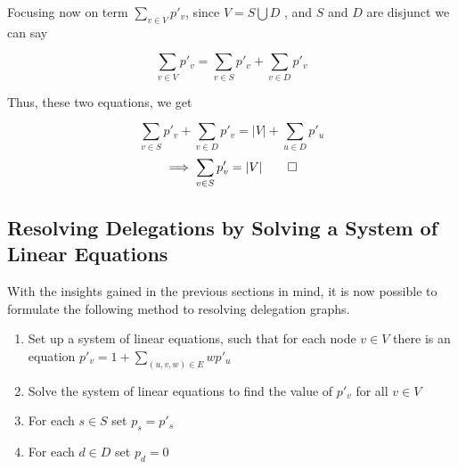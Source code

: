 Focusing now on term $\sum_{v \in V} p'_v$, since $V = S \bigcup D$ , and $S$ and $D$ are disjunct we can say

\[
\sum_{v \in V} p'_v = \sum_{v \in S} p'_v  + \sum_{v \in D} p'_v 
\]

Thus, these two equations, we get

\[
\sum_{v \in S} p'_v  + \sum_{v \in D} p'_v  = |V| + \sum_{u \in D} p'_u
\]
\[
\implies \sum_{v \in S} p'_v   = |V| \qed
\]


\subsection{Resolving Delegations by Solving a System of Linear Equations}

With the insights gained in the previous sections in mind, it is now possible to formulate the following method to resolving delegation graphs.

\begin{enumerate}
\item Set up a system of linear equations, such that for each node $v \in V$ there is an equation $p'_v = 1+\sum_{(u, v, w) \in E}wp'_u$
\item Solve the system of linear equations to find the value of $p'_v$ for all $v \in V$
\item For each $s \in S$ set $p_s = p'_s$
\item For each $d \in D$ set $p_d = 0$
\end{enumerate}


